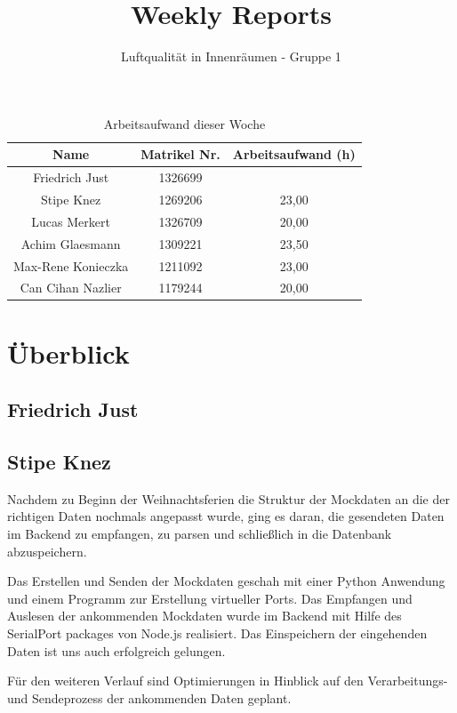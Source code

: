 \documentclass[]{article}
\title{Weekly Reports}
\author{Luftqualität in Innenräumen - Gruppe 1}
\begin{document}
\maketitle

\begin{table}[h!]
	\centering
	\begin{tabular}{|c|c|c|}
		\hline
		{\textbf{Name}}				&		{\textbf{Matrikel Nr.}} & {\textbf{Arbeitsaufwand (h)}} \\
		\hline
		Friedrich Just				&		1326699 				&		\\
		\hline
		Stipe Knez				&		1269206 				&	23,00	\\
		\hline
		Lucas Merkert				&		1326709					&	20,00	\\
		\hline
		Achim Glaesmann				&		1309221					&	23,50	\\
		\hline
		Max-Rene Konieczka			&		1211092					&	23,00	\\
		\hline
		Can Cihan Nazlier			&		1179244					&	20,00	\\
		\hline
	\end{tabular}
	\caption{Arbeitsaufwand dieser Woche}
	\label{tab:worakload}
\end{table}



\section{Überblick}


\subsection{Friedrich Just}

\subsection{Stipe Knez}
Nachdem zu Beginn der Weihnachtsferien die Struktur der Mockdaten an die der richtigen Daten nochmals angepasst wurde, ging es daran, die gesendeten Daten im Backend zu empfangen, zu parsen und schließlich in die Datenbank abzuspeichern.
 
Das Erstellen und Senden der Mockdaten geschah mit einer Python Anwendung und einem Programm zur Erstellung virtueller Ports. Das Empfangen und Auslesen der ankommenden Mockdaten wurde im Backend mit Hilfe des  SerialPort packages von Node.js realisiert. Das Einspeichern der eingehenden Daten ist uns auch erfolgreich gelungen.

Für den weiteren Verlauf sind Optimierungen in Hinblick auf den Verarbeitungs- und Sendeprozess der ankommenden Daten geplant.
\end{document}
